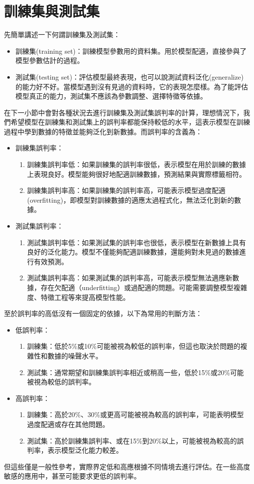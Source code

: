 \section{訓練集與測試集}
先簡單講述一下何謂訓練集及測試集：
\begin{itemize}
\item 訓練集(training set)：訓練模型參數用的資料集。用於模型配適，直接參與了模型參數估計的過程。
\item 測試集(testing set)：評估模型最終表現，也可以說測試資料泛化(generalize)的能力好不好。當模型遇到沒有見過的資料時，它的表現怎麼樣。為了能評估模型真正的能力，測試集不應該為參數調整、選擇特徵等依據。
\end{itemize}
在下一小節中會對各種狀況去進行訓練集及測試集誤判率的計算，理想情況下，我們希望模型在訓練集和測試集上的誤判率都能保持較低的水平，這表示模型在訓練過程中學到數據的特徵並能夠泛化到新數據。而誤判率的含義為：
\begin{itemize}
\item 訓練集誤判率：
\begin{enumerate}
\item 訓練集誤判率低：如果訓練集的誤判率很低，表示模型在用於訓練的數據上表現良好。模型能夠很好地配適訓練數據，預測結果與實際標籤相符。
\item 訓練集誤判率高：如果訓練集的誤判率高，可能表示模型過度配適(overfitting)，即模型對訓練數據的適應太過程式化，無法泛化到新的數據。
\end{enumerate}
\item 測試集誤判率：
\begin{enumerate}
\item 測試集誤判率低：如果測試集的誤判率也很低，表示模型在新數據上具有良好的泛化能力。模型不僅能夠配適訓練數據，還能夠對未見過的數據進行有效預測。
\item 測試集誤判率高：如果測試集的誤判率高，可能表示模型無法適應新數據，存在欠配適（underfitting）或過配適的問題。可能需要調整模型複雜度、特徵工程等來提高模型性能。
\end{enumerate}
\end{itemize}
至於誤判率的高低沒有一個固定的依據，以下為常用的判斷方法：
\begin{itemize}
\item 低誤判率：
\begin{enumerate}
\item 訓練集：低於5\%或10\%可能被視為較低的誤判率，但這也取決於問題的複雜性和數據的噪聲水平。
\item 測試集：通常期望和訓練集誤判率相近或稍高一些，低於15\%或20\%可能被視為較低的誤判率。
\end{enumerate}
\item 高誤判率：
\begin{enumerate}
\item 訓練集：高於20\%、30\%或更高可能被視為較高的誤判率，可能表明模型過度配適或存在其他問題。
\item 測試集：高於訓練集誤判率、或在15\%到20\%以上，可能被視為較高的誤判率，表示模型泛化能力較差。
\end{enumerate}
\end{itemize}
但這些僅是一般性參考，實際界定低和高應根據不同情境去進行評估。在一些高度敏感的應用中，甚至可能要求更低的誤判率。
